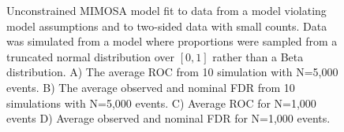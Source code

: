 \documentclass{article}
\begin{document}
\begin{figure}
\begin{tikzpicture} [auto,node distance=0cm]
 \end{tikzpicture}
   \caption{Unconstrained MIMOSA model fit to data from a model
     violating model assumptions and to two-sided data with small
     counts. Data was simulated from a model where proportions were
     sampled from a truncated normal distribution over $[0,1]$ rather
     than a Beta distribution.  A) The average ROC from 10 simulation
     with N=5,000 events. B) The average observed and nominal FDR from
     10 simulations with N=5,000 events. C) Average ROC for N=1,000
     events D) Average observed and nominal FDR for N=1,000 events.
}
   \label{webfig:simulations_trunc}
\end{figure}
\clearpage



\end{document}
